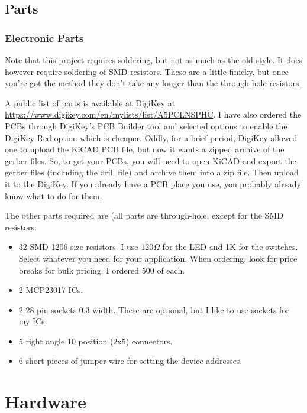\documentclass[10pt, openany]{book}
\begin{document}
\section{Parts}
\subsection{Electronic Parts}
Note that this project requires soldering, but not as much as the old style.  It does however require soldering of SMD resistors.  These are a little finicky, but once you're got the method they don't take any longer than the through-hole resistors.

A public list of parts is available at DigiKey at \url{https://www.digikey.com/en/mylists/list/A5PCLNSPHC}.  I have also ordered the PCBs through DigiKey's PCB Builder tool and selected options to enable the DigiKey Red option which is cheaper.  Oddly, for a brief period, DigiKey allowed one to upload the KiCAD PCB file, but now it wants a zipped archive of the gerber files.  So, to get your PCBs, you will need to open KiCAD and export the gerber files (including the drill file) and archive them into a zip file.  Then upload it to the DigiKey.  If you already have a PCB place you use, you probably already know what to do for them.

The other parts required are (all parts are through-hole, except for the SMD resistors:
\begin{itemize}
  \item 32 SMD 1206 size resistors.  I use $120\Omega$ for the LED and 1K for the switches.  Select whatever you need for your application.  When ordering, look for price breaks for bulk pricing.  I ordered 500 of each.
  \item 2 MCP23017 ICs.
  \item 2 28 pin sockets 0.3 width.  These are optional, but I like to use sockets for my ICs.
  \item 5 right angle 10 position (2x5) connectors.
  \item 6 short pieces of jumper wire for setting the device addresses.
\end{itemize}

\chapter{Hardware}
\end{document}
